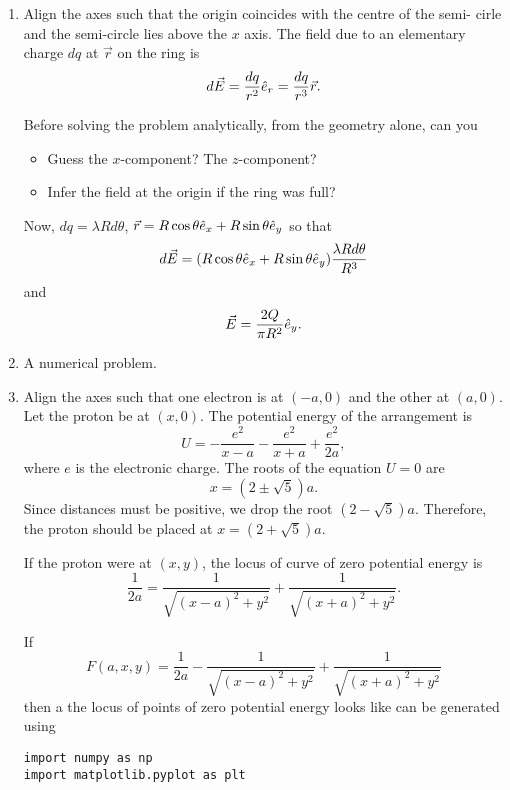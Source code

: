 \documentclass{article}
\begin{document}
\begin{enumerate}
\item Align the axes such that the origin coincides with the centre of the semi-
cirle and the semi-circle lies above the $x$ axis. The field due to an elementary
charge $dq$ at $\vec{r}$ on the ring is
\[
d\vec{E} = \frac{dq}{r^2}\hat{e}_{r} = \frac{dq}{r^3}\vec{r}.
\]

Before solving the problem analytically, from the geometry alone, can you
\begin{itemize}
\item Guess the $x$-component? The $z$-component?
\item Infer the field at the origin if the ring was full?
\end{itemize}
Now, $dq = \lambda Rd\theta$, $\vec{r} = R\cos\theta\hat{e}_{x} + R\sin\theta\hat{e}_{y}$ so
that
\[
d\vec{E} = (R\cos\theta\hat{e}_{x} + R\sin\theta\hat{e}_{y})\frac{\lambda R d\theta}{R^3}
\]
and
\begin{equation}\label{e9}
\vec{E} = \frac{2Q}{\pi R^2}\hat{e}_{y}.
\end{equation}

\item A numerical problem.

\item Align the axes such that one electron is at $(-a, 0)$ and the other at 
$(a, 0)$. Let the proton be at $(x, 0)$. The potential energy of the arrangement
is
\begin{equation}\label{e10}
U = -\frac{e^2}{x - a} - \frac{e^2}{x + a} + \frac{e^2}{2a},
\end{equation}
where $e$ is the electronic charge. The roots of the equation $U = 0$ are
\begin{equation}\label{e11}
x = (2 \pm \sqrt{5})a.
\end{equation}
Since distances must be positive, we drop the root $(2 - \sqrt{5})a$. Therefore,
the proton should be placed at $x = (2 + \sqrt{5})a$.

If the proton were at $(x, y)$, the locus of curve of zero potential energy is
\begin{equation}\label{e12}
\frac{1}{2a} = \frac{1}{\sqrt{(x - a)^2 + y^2}} + \frac{1}{\sqrt{(x + a)^2 + y^2}}.
\end{equation}

If
\begin{equation}\label{e13}
F(a, x, y) = \frac{1}{2a} - \frac{1}{\sqrt{(x - a)^2 + y^2}} + \frac{1}{\sqrt{(x + a)^2 + y^2}}
\end{equation}
then a the locus of points of zero potential energy looks like can be generated using
\begin{verbatim}
import numpy as np
import matplotlib.pyplot as plt


\end{verbatim}
\end{enumerate}
\end{document}
